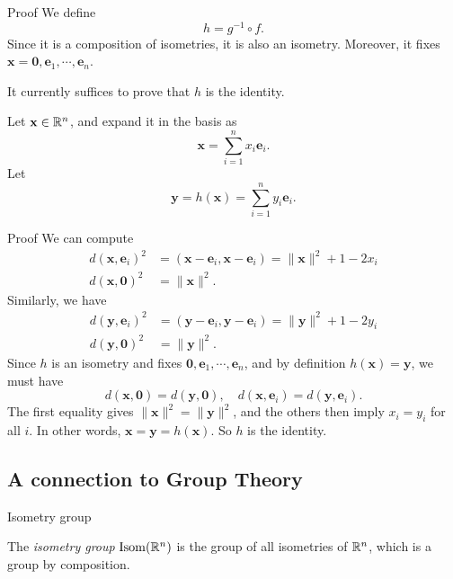 \begin{frame}{Proof}
    We define
  \[
    h = g^{-1}\circ f.
  \]
  Since it is a composition of isometries, it is also an isometry. Moreover, it fixes $\mathbf{x} = \mathbf{0}, \mathbf{e}_1, \cdots, \mathbf{e}_n$.

  It currently suffices to prove that $h$ is the identity.

  Let $\mathbf{x} \in \mathbb{R}^n$, and expand it in the basis as
  \[
    \mathbf{x} = \sum_{i = 1}^n x_i \mathbf{e}_i.
  \]
  Let
  \[
    \mathbf{y} = h(\mathbf{x}) = \sum_{i = 1}^n y_i \mathbf{e}_i.
  \]
\end{frame}

\begin{frame}{Proof}
    We can compute
  \begin{align*}
    d(\mathbf{x}, \mathbf{e}_i)^2 &= (\mathbf{x} - \mathbf{e}_i, \mathbf{x} - \mathbf{e}_i) = \|\mathbf{x}\|^2 + 1 - 2 x_i\\
    d(\mathbf{x}, \mathbf{0})^2 &= \|\mathbf{x}\|^2.
  \end{align*}
  Similarly, we have
  \begin{align*}
    d(\mathbf{y}, \mathbf{e}_i)^2 &= (\mathbf{y} - \mathbf{e}_i, \mathbf{y} - \mathbf{e}_i) = \|\mathbf{y}\|^2 + 1 - 2 y_i\\
    d(\mathbf{y}, \mathbf{0})^2 &= \|\mathbf{y}\|^2.
  \end{align*}
  Since $h$ is an isometry and fixes $\mathbf{0}, \mathbf{e}_1, \cdots, \mathbf{e}_n$, and by definition $h(\mathbf{x}) = \mathbf{y}$, we must have
  \[
    d(\mathbf{x}, \mathbf{0}) = d(\mathbf{y}, \mathbf{0}), \quad d(\mathbf{x}, \mathbf{e}_i) = d(\mathbf{y}, \mathbf{e}_i).
  \]
  The first equality gives $\|\mathbf{x}\|^2 = \|\mathbf{y}\|^2$, and the others then imply $x_i = y_i$ for all $i$. In other words, $\mathbf{x} = \mathbf{y} = h(\mathbf{x})$. So $h$ is the identity.
\end{frame}

\subsection{A connection to Group Theory}

\begin{frame}{Isometry group}
    \begin{defi}
      The \emph{isometry group} $\operatorname{Isom}(\mathbb{R}^n)$ is the group of all isometries of $\mathbb{R}^n$, which is a group by composition.
    \end{defi}
\end{frame}

